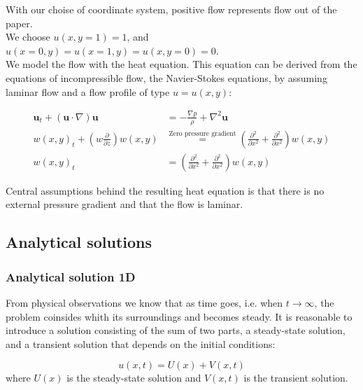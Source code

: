 \documentclass{article}
\begin{document}
With our choise of coordinate system, positive flow represents flow out of the paper. \\

We choose $u(x,y=1) = 1$, and $u(x=0, y) = u(x=1,y) = u(x,y=0) = 0$. \\

We model the flow with the heat equation. This equation can be derived from the equations of incompressible flow, the Navier-Stokes equations, by assuming laminar flow and a flow profile of type $u = u(x,y)$:

\begin{subequations}
	\begin{align}
	\mathbf{u}_t + (\mathbf{u} \cdot \nabla) \mathbf{u} &= -\frac{\nabla p}{\rho} + \nabla^2 \mathbf{u}\\
	w(x,y)_t + (w \frac{\partial}{\partial z}) w(x,y) &\stackrel{\text{Zero pressure gradient}}{=} (\frac{\partial^2}{\partial x^2} + \frac{\partial^2}{\partial x^2} ) w(x,y)\\
	w(x,y)_t &= (\frac{\partial^2}{\partial x^2} + \frac{\partial^2}{\partial x^2} )w(x,y)\label{eq:ns}
	\end{align}
\end{subequations}

Central assumptions behind the resulting heat equation is that there is no external pressure gradient and that the flow is laminar. 

\subsection{Analytical solutions}

\subsubsection{Analytical solution 1D}


From physical observations we know that as time goes, i.e. when $t\rightarrow \infty$,  the problem coinsides whith its surroundings and becomes steady. It is reasonable to introduce a solution consisting of the sum of two parts, a steady-state solution, and a transient solution that depends on the initial conditions:

\begin{equation}
u(x,t) = U(x) + V(x,t)
\end{equation}
where $U(x)$ is the steady-state solution and $V(x,t)$ is the transient solution.\\ 
\end{document}
